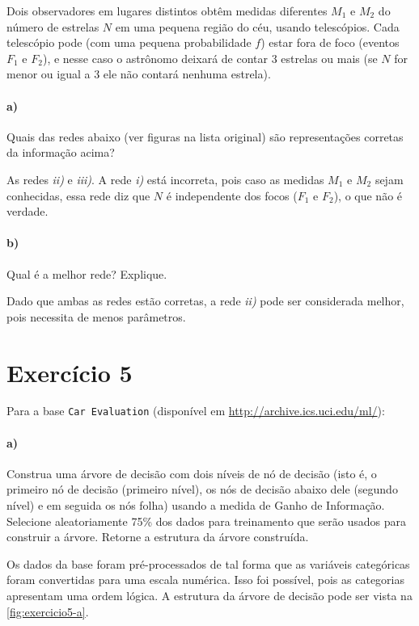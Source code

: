 \documentclass{article}
\begin{document}
Dois observadores em lugares distintos obtêm medidas diferentes $M_1$ e $M_2$ do número de estrelas $N$ em uma pequena região do céu, usando telescópios. Cada telescópio pode (com uma pequena probabilidade $f$) estar fora de foco (eventos $F_1$ e $F_2$), e nesse caso o astrônomo deixará de contar 3 estrelas ou mais (se $N$ for menor ou igual a 3 ele não contará nenhuma estrela).

\paragraph{a)} Quais das redes abaixo (ver figuras na lista original) são representações corretas da informação acima?

As redes \textit{ii)} e \textit{iii)}. A rede \textit{i)} está incorreta, pois caso as medidas $M_1$ e $M_2$ sejam conhecidas, essa rede diz que $N$ é independente dos focos ($F_1$ e $F_2$), o que não é verdade.

\paragraph{b)} Qual é a melhor rede? Explique.

Dado que ambas as redes estão corretas, a rede \textit{ii)} pode ser considerada melhor, pois necessita de menos parâmetros.

\section{Exercício 5}

Para a base \texttt{Car Evaluation} (disponível em \url{http://archive.ics.uci.edu/ml/}):

\paragraph{a)} Construa uma árvore de decisão com dois níveis de nó de decisão (isto é, o primeiro nó de decisão (primeiro nível), os nós de decisão abaixo dele (segundo nível) e em seguida os nós folha) usando a medida de Ganho de Informação. Selecione aleatoriamente 75\% dos dados para treinamento que serão usados para construir a árvore. Retorne a estrutura da árvore construída.

Os dados da base foram pré-processados de tal forma que as variáveis categóricas foram convertidas para uma escala numérica. Isso foi possível, pois as categorias apresentam uma ordem lógica. A estrutura da árvore de decisão pode ser vista na \autoref{fig:exercicio5-a}.
\end{document}
